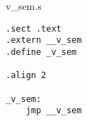 v\_sem.s

\begin{verbatim}
.sect .text
.extern __v_sem
.define _v_sem

.align 2

_v_sem:
	jmp __v_sem
\end{verbatim}
